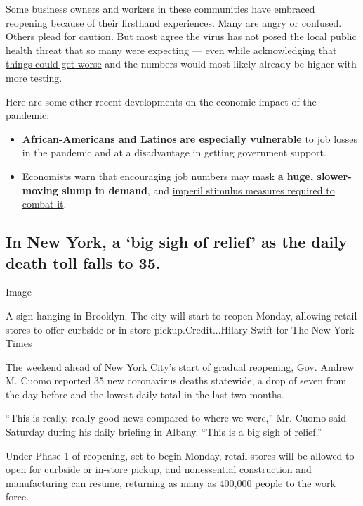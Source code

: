 Some business owners and workers in these communities have embraced
reopening because of their firsthand experiences. Many are angry or
confused. Others plead for caution. But most agree the virus has not
posed the local public health threat that so many were expecting ---
even while acknowledging that
\href{https://www.nytimes3xbfgragh.onion/2020/05/20/us/coronavirus-reopening-50-states.html}{things
could get worse} and the numbers would most likely already be higher
with more testing.

Here are some other recent developments on the economic impact of the
pandemic:

\begin{itemize}
\item
  \textbf{African-Americans and Latinos}
  \textbf{\href{https://www.nytimes3xbfgragh.onion/2020/06/06/business/economy/jobs-report-minorities.html}{are
  especially vulnerable}} to job losses in the pandemic and at a
  disadvantage in getting government support.
\item
  Economists warn that encouraging job numbers may mask \textbf{a huge,
  slower-moving slump in demand}, and
  \href{https://www.nytimes3xbfgragh.onion/2020/06/06/upshot/coronavirus-economic-crisis.html}{imperil
  stimulus measures required to combat it}.
\end{itemize}

\hypertarget{in-new-york-a-big-sigh-of-relief-as-the-daily-death-toll-falls-to-35}{%
\subsection{In New York, a `big sigh of relief' as the daily death toll
falls to
35.}\label{in-new-york-a-big-sigh-of-relief-as-the-daily-death-toll-falls-to-35}}

Image

A sign hanging in Brooklyn. The city will start to reopen Monday,
allowing retail stores to offer curbside or in-store
pickup.Credit...Hilary Swift for The New York Times

The weekend ahead of New York City's start of gradual reopening, Gov.
Andrew M. Cuomo reported 35 new coronavirus deaths statewide, a drop of
seven from the day before and the lowest daily total in the last two
months.

``This is really, really good news compared to where we were,'' Mr.
Cuomo said Saturday during his daily briefing in Albany. ``This is a big
sigh of relief.''

Under Phase 1 of reopening, set to begin Monday, retail stores will be
allowed to open for curbside or in-store pickup, and nonessential
construction and manufacturing can resume, returning as many as 400,000
people to the work force.

